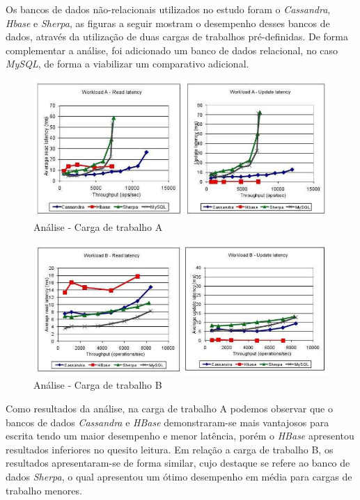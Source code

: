 \documentclass[12pt]{article}
\begin{document}
Os bancos de dados não-relacionais utilizados no estudo foram o \textit{Cassandra}, \textit{Hbase} e \textit{Sherpa}, as figuras a seguir mostram o desempenho desses bancos de dados, através da utilização de duas cargas de trabalhos pré-definidas. De forma complementar a análise, foi adicionado um banco de dados relacional, no caso \textit{MySQL}, de forma a viabilizar um comparativo adicional.

\begin{figure}[ht]
	\centering
	\includegraphics[width=.9\textwidth]{img/cargaA.png}
	\caption{Análise - Carga de trabalho A}
	\label{img:cargaA}
\end{figure}

\begin{figure}[ht]
	\centering
	\includegraphics[width=.9\textwidth]{img/cargaB.png}
	\caption{Análise - Carga de trabalho B}
	\label{img:cargaB}
\end{figure}

Como resultados da análise, na carga de trabalho A podemos observar que o bancos de dados \textit{Cassandra} e \textit{HBase} demonstraram-se mais vantajosos para escrita tendo um maior desempenho e menor latência, porém o \textit{HBase} apresentou resultados inferiores no quesito leitura. Em relação a carga de trabalho B, os resultados apresentaram-se de forma similar, cujo destaque se refere ao banco de dados \textit{Sherpa}, o qual apresentou um ótimo desempenho em média para cargas de trabalho menores.
\end{document}
